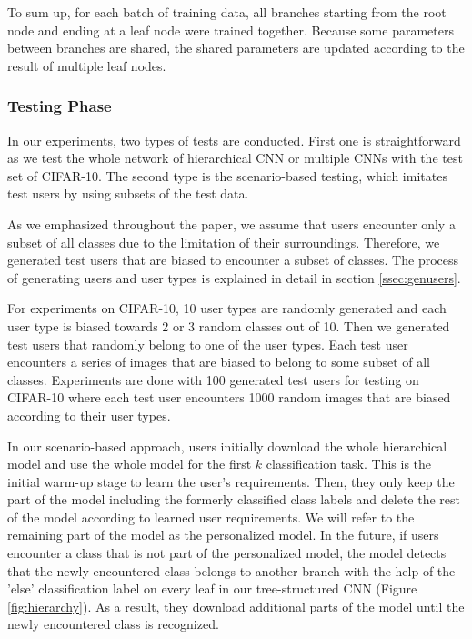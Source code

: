 To sum up, for each batch of training data, all branches starting from the root node and ending at a leaf node were trained together. Because some parameters between branches are shared, the shared parameters are updated according to the result of multiple leaf nodes.

\subsubsection*{Testing Phase}
In our experiments, two types of tests are conducted. 
First one is straightforward as we test the whole network of hierarchical CNN or multiple CNNs with the test set of CIFAR-10. 
The second type is the scenario-based testing, which imitates test users by using subsets of the test data.

As we emphasized throughout the paper, we assume that users encounter only a subset of all classes due to the limitation of their surroundings.
Therefore, we generated test users that are biased to encounter a subset of classes. 
The process of generating users and user types is explained in detail in section \ref{ssec:genusers}. 

For experiments on CIFAR-10, 10 user types are randomly generated and each user type is biased towards 2 or 3 random classes out of 10.
Then we generated test users that randomly belong to one of the user types. 
Each test user encounters a series of images that are biased to belong to some subset of all classes. 
Experiments are done with 100 generated test users for testing on CIFAR-10 where each test user encounters 1000 random images that are biased according to their user types.

In our scenario-based approach, users initially download the whole hierarchical model and use the whole model for the first $k$ classification task. 
This is the initial warm-up stage to learn the user's requirements.
Then, they only keep the part of the model including the formerly classified class labels and delete the rest of the model according to learned user requirements.
We will refer to the remaining part of the model as the personalized model.
In the future, if users encounter a class that is not part of the personalized model, the model detects that the newly encountered class belongs to another branch with the help of the 'else' classification label on every leaf in our tree-structured CNN (Figure \ref{fig:hierarchy}). 
As a result, they download additional parts of the model until the newly encountered class is recognized. 

